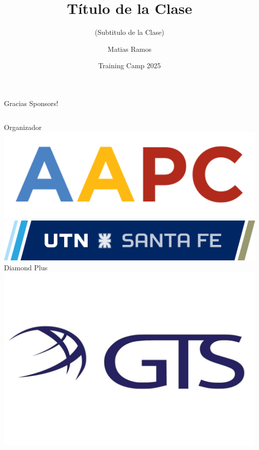 \documentclass{beamer}
\title %
{Título de la Clase}
\subtitle{(Subtitulo de la Clase)}
\author[Matias Ramos]{Matias Ramos}
\institute[]{Universidad Tecnológica Nacional - Facultad Regional Santa Fe}
\date[TC 2025]{Training Camp 2025}
\begin{document}
\frame{\titlepage}



\begin{frame}{Gracias Sponsors!}
    \begin{columns}[t]
        \centering
        Organizador\\
        \vspace{0.5cm}
        \includegraphics[width=1\textwidth,keepaspectratio]{logos/aapc.png}
        \includegraphics[width=1\textwidth,keepaspectratio]{logos/utn_santafe.png}
        \centering
        Diamond Plus\\
        \includegraphics[width=1\textwidth,keepaspectratio]{logos/GTSlogo.jpeg}
    \end{columns}

\end{frame}
\end{document}
